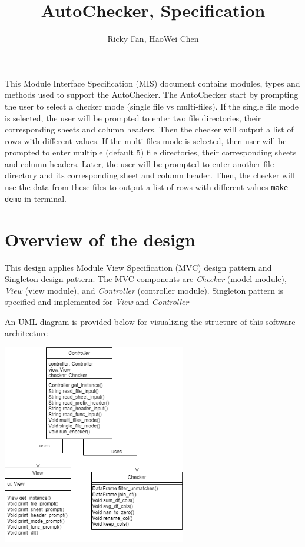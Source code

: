 \documentclass[12pt]{article}
\title{AutoChecker, Specification}
\author{Ricky Fan, HaoWei Chen}
\begin{document}
\maketitle
\noindent This Module Interface Specification (MIS) document contains modules, types and
methods used to support the AutoChecker. The AutoChecker start by prompting the user to select a 
checker mode (single file vs multi-files). If the single file mode is selected, the user will be 
prompted to enter two file directories, their corresponding sheets and column headers. Then the 
checker will output a list of rows with different values. If the multi-files mode is selected, 
then user will be prompted to enter multiple (default $5$) file directories, their corresponding 
sheets and column headers. Later, the user will be prompted to enter another file directory 
and its corresponding sheet and column header. Then, the checker will use the data from these 
files to output a list of rows with different values
\texttt{make demo} in terminal.

\newpage

\section{Overview of the design}

This design applies Module View Specification (MVC) design pattern and 
Singleton design pattern. The MVC components are \textit{Checker} (model module), 
\textit{View} (view module), and \textit{Controller} (controller module). Singleton pattern is 
specified and implemented for \textit{View} and \textit{Controller} 

\bigskip

\noindent An UML diagram is provided below for visualizing the structure of this software architecture

\begin{center}
  \includegraphics[width=0.6\textwidth]{UML_AutoChecker.png}
\end{center}
\end{document}
